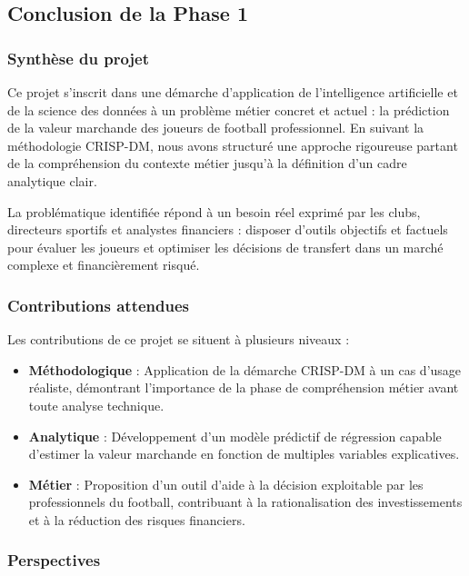 \documentclass[12pt,a4paper]{article}
\begin{document}
\newpage

\subsection{Conclusion de la Phase 1}

\subsubsection{Synthèse du projet}

Ce projet s'inscrit dans une démarche d'application de l'intelligence artificielle et de la science des données à un problème métier concret et actuel : la prédiction de la valeur marchande des joueurs de football professionnel. En suivant la méthodologie CRISP-DM, nous avons structuré une approche rigoureuse partant de la compréhension du contexte métier jusqu'à la définition d'un cadre analytique clair.

La problématique identifiée répond à un besoin réel exprimé par les clubs, directeurs sportifs et analystes financiers : disposer d'outils objectifs et factuels pour évaluer les joueurs et optimiser les décisions de transfert dans un marché complexe et financièrement risqué.

\subsubsection{Contributions attendues}

Les contributions de ce projet se situent à plusieurs niveaux :

\begin{itemize}[leftmargin=*]
    \item \textbf{Méthodologique} : Application de la démarche CRISP-DM à un cas d'usage réaliste, démontrant l'importance de la phase de compréhension métier avant toute analyse technique.
    
    \item \textbf{Analytique} : Développement d'un modèle prédictif de régression capable d'estimer la valeur marchande en fonction de multiples variables explicatives.
    
    \item \textbf{Métier} : Proposition d'un outil d'aide à la décision exploitable par les professionnels du football, contribuant à la rationalisation des investissements et à la réduction des risques financiers.
\end{itemize}

\subsubsection{Perspectives}
\end{document}
